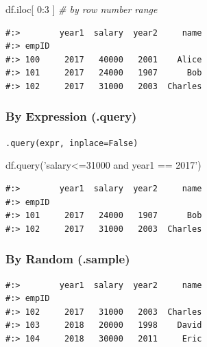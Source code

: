 \documentclass[
]{book}
\newenvironment{Shaded}{\begin{snugshade}}{\end{snugshade}}
\newcommand{\CommentTok}[1]{\textcolor[rgb]{0.37,0.37,0.37}{\textit{#1}}}
\newcommand{\DecValTok}[1]{\textcolor[rgb]{0.06,0.06,0.06}{#1}}
\newcommand{\FloatTok}[1]{\textcolor[rgb]{0.06,0.06,0.06}{#1}}
\newcommand{\NormalTok}[1]{#1}
\newcommand{\OperatorTok}[1]{\textcolor[rgb]{0.43,0.43,0.43}{\textbf{#1}}}
\newcommand{\StringTok}[1]{\textcolor[rgb]{0.5,0.5,0.5}{#1}}
\begin{document}
\begin{Shaded}
\begin{Highlighting}[]
\NormalTok{df.iloc[  }\DecValTok{0}\NormalTok{:}\DecValTok{3}\NormalTok{  ]    }\CommentTok{# by row number range}
\end{Highlighting}
\end{Shaded}

\begin{verbatim}
#:>        year1  salary  year2     name
#:> empID                               
#:> 100     2017   40000   2001    Alice
#:> 101     2017   24000   1907      Bob
#:> 102     2017   31000   2003  Charles
\end{verbatim}

\hypertarget{by-expression-.query}{%
\subsubsection{By Expression (.query)}\label{by-expression-.query}}

\texttt{.query(expr,\ inplace=False)}

\begin{Shaded}
\begin{Highlighting}[]
\NormalTok{df.query(}\StringTok{'salary<=31000 and year1 == 2017'}\NormalTok{)}
\end{Highlighting}
\end{Shaded}

\begin{verbatim}
#:>        year1  salary  year2     name
#:> empID                               
#:> 101     2017   24000   1907      Bob
#:> 102     2017   31000   2003  Charles
\end{verbatim}

\hypertarget{by-random-.sample}{%
\subsubsection{By Random (.sample)}\label{by-random-.sample}}

\begin{Shaded}
\end{Shaded}

\begin{verbatim}
#:>        year1  salary  year2     name
#:> empID                               
#:> 102     2017   31000   2003  Charles
#:> 103     2018   20000   1998    David
#:> 104     2018   30000   2011     Eric
\end{verbatim}
\end{document}
